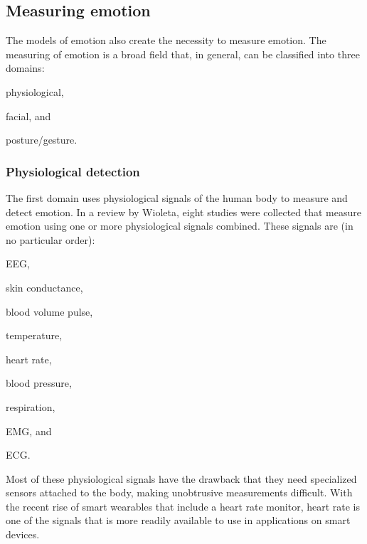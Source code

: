 \documentclass{sigchi}
\begin{document}
\subsection{Measuring emotion} %
\label{sub:measuring_emotion}
The models of emotion also create the necessity to measure emotion. The measuring of emotion is a broad field that, in general, can be classified into three domains:
\begin{enumerate*}[label=(\alph*)]
  \item physiological,
  \item facial, and
  \item posture/gesture.
\end{enumerate*}


\subsubsection{Physiological detection} %
\label{sub:physiology}
The first domain uses physiological signals of the human body to measure and detect emotion. In a review by Wioleta\cite{Wioleta2013}, eight studies were collected that measure emotion using one or more physiological signals combined. These signals are (in no particular order):
\begin{enumerate*}[label=(\alph*)]
  \item EEG,
  \item skin conductance,
  \item blood volume pulse,
  \item temperature,
  \item heart rate,
  \item blood pressure,
  \item respiration,
  \item EMG, and
  \item ECG.
\end{enumerate*}
Most of these physiological signals have the drawback that they need specialized sensors attached to the body, making unobtrusive measurements difficult. With the recent rise of smart wearables that include a heart rate monitor, heart rate is one of the signals that is more readily available to use in applications on smart devices.
\end{document}

